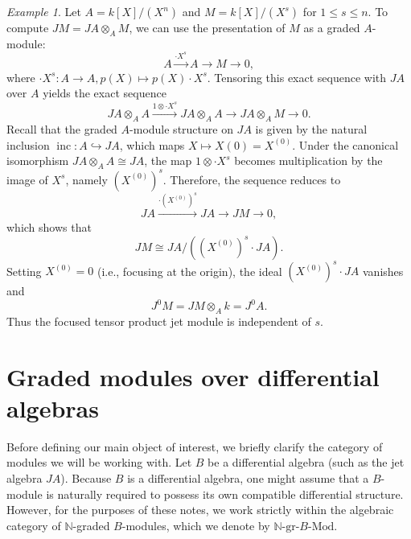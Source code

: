 \documentclass[a4paper, 12pt]{amsart}
\theoremstyle{definition}
\theoremstyle{remark}
\newtheorem{example}[theorem]{Example}
\begin{document}
\begin{example}
  \label{exa:JM-cyclic}
  Let $A = k[X]/(X^n)$ and $M = k[X]/(X^s)$ for $1 \le s \le n$.
  To compute $JM = JA \otimes_A M$, we can use the presentation of $M$ as a graded $A$-module:
  \begin{equation*}
    A \xrightarrow{\cdot X^s} A \to M \to 0,
  \end{equation*}
  where $\cdot X^s: A \to A, p(X) \mapsto p(X)\cdot X^s$.
  Tensoring this exact sequence with $JA$ over $A$ yields the exact sequence
  \begin{equation*}
    JA \otimes_A A \xrightarrow{1 \otimes \cdot X^s} JA \otimes_A A \to JA \otimes_A M \to 0.
  \end{equation*}
  Recall that the graded $A$-module structure on $JA$ is given by the natural inclusion $\operatorname{inc}: A \hookrightarrow JA$, which maps $X \mapsto X(0) = X^{(0)}$.
  Under the canonical isomorphism $JA \otimes_A A \cong JA$, the map $1 \otimes \cdot X^s$ becomes multiplication by the image of $X^s$, namely $(X^{(0)})^s$.
  Therefore, the sequence reduces to
  \begin{equation*}
    JA \xrightarrow{\cdot (X^{(0)})^s} JA \to JM \to 0,
  \end{equation*}
  which shows that
  \begin{equation*}
    JM \cong JA / ((X^{(0)})^s \cdot JA).
  \end{equation*}
  Setting $X^{(0)} = 0$ (i.e., focusing at the origin),
  the ideal $(X^{(0)})^s \cdot JA$ vanishes and
  \begin{equation*}
    J^0M = JM \otimes_A k = J^0A.
  \end{equation*}
  Thus the focused tensor product jet module is independent of $s$.
\end{example}

\section{Graded modules over differential algebras}
\label{sec:graded-modules-diff-alg}

Before defining our main object of interest, we briefly clarify the category of modules we will be working with. Let $B$ be a differential algebra (such as the jet algebra $JA$). Because $B$ is a differential algebra, one might assume that a $B$-module is naturally required to possess its own compatible differential structure. However, for the purposes of these notes, we work strictly within the algebraic category of $\mathbb{N}$-graded $B$-modules, which we denote by $\mathbb{N}\text{-gr-}B\text{-Mod}$.
\end{document}

